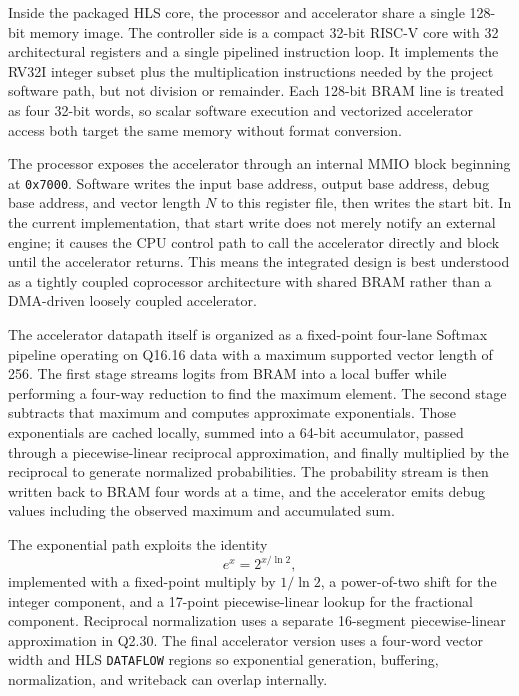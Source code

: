\documentclass[conference]{IEEEtran}
\begin{document}
Inside the packaged HLS core, the processor and accelerator share a single 128-bit memory image. The controller side is a compact 32-bit RISC-V core with 32 architectural registers and a single pipelined instruction loop. It implements the RV32I integer subset plus the multiplication instructions needed by the project software path, but not division or remainder. Each 128-bit BRAM line is treated as four 32-bit words, so scalar software execution and vectorized accelerator access both target the same memory without format conversion.

The processor exposes the accelerator through an internal MMIO block beginning at \texttt{0x7000}. Software writes the input base address, output base address, debug base address, and vector length $N$ to this register file, then writes the start bit. In the current implementation, that start write does not merely notify an external engine; it causes the CPU control path to call the accelerator directly and block until the accelerator returns. This means the integrated design is best understood as a tightly coupled coprocessor architecture with shared BRAM rather than a DMA-driven loosely coupled accelerator.

The accelerator datapath itself is organized as a fixed-point four-lane Softmax pipeline operating on Q16.16 data with a maximum supported vector length of 256. The first stage streams logits from BRAM into a local buffer while performing a four-way reduction to find the maximum element. The second stage subtracts that maximum and computes approximate exponentials. Those exponentials are cached locally, summed into a 64-bit accumulator, passed through a piecewise-linear reciprocal approximation, and finally multiplied by the reciprocal to generate normalized probabilities. The probability stream is then written back to BRAM four words at a time, and the accelerator emits debug values including the observed maximum and accumulated sum.

The exponential path exploits the identity
\begin{equation}
e^x = 2^{x / \ln 2},
\end{equation}
implemented with a fixed-point multiply by $1 / \ln 2$, a power-of-two shift for the integer component, and a 17-point piecewise-linear lookup for the fractional component. Reciprocal normalization uses a separate 16-segment piecewise-linear approximation in Q2.30. The final accelerator version uses a four-word vector width and HLS \texttt{DATAFLOW} regions so exponential generation, buffering, normalization, and writeback can overlap internally.
\end{document}
